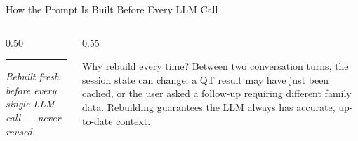 \documentclass[aspectratio=169,10pt]{beamer}
\begin{document}
\begin{frame}[t]{How the Prompt Is Built Before Every LLM Call}
\begin{columns}[T]
\begin{column}{0.50\textwidth}
    \textcolor{aorng}{\rule[0.4ex]{0.25cm}{0.7pt}}\;
    \textcolor{aorng}{\scriptsize\textit{Rebuilt fresh before every single LLM call — never reused.}}
  \end{column}
  \begin{column}{0.55\textwidth}
    \vspace{4pt}
    \begin{block}{Why rebuild every time?}
      \small Between two conversation turns, the session
      state can change: a QT result may have just been
      cached, or the user asked a follow-up requiring
      different family data. Rebuilding guarantees the
      LLM always has accurate, up-to-date context.
    \end{block}
  \end{column}
\end{columns}
\end{frame}
\end{document}
